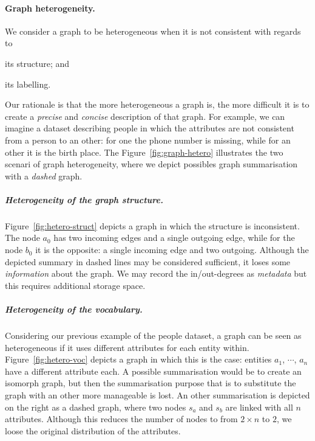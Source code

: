 \paragraph{Graph heterogeneity.}

We consider a graph to be heterogeneous when it is not consistent with regards to
\begin{inparaenum}[(a)]
\item its structure; and
\item its labelling.
\end{inparaenum}
Our rationale is that the more heterogeneous a graph is, the more difficult it is to create a \emph{precise} and \emph{concise} description of that graph. For example, we can imagine a dataset describing people in which the attributes are not consistent from a person to an other: for one the phone number is missing, while for an other it is the birth place. The Figure~\ref{fig:graph-hetero} illustrates the two scenari of graph heterogeneity, where we depict possibles graph summarisation with a \textit{dashed} graph.

\subparagraph{Heterogeneity of the graph structure.}

Figure~\ref{fig:hetero-struct} depicts a graph in which the structure is inconsistent. The node $a_0$ has two incoming edges and a single outgoing edge, while for the node $b_0$ it is the opposite: a single incoming edge and two outgoing. Although the depicted summary in dashed lines may be considered sufficient, it loses some \emph{information} about the graph. We may record the in/out-degrees as \emph{metadata} but this requires additional storage space.

\subparagraph{Heterogeneity of the vocabulary.}

Considering our previous example of the people dataset, a graph can be seen as heterogeneous if it uses different attributes for each entity within. Figure~\ref{fig:hetero-voc} depicts a graph in which this is the case: entities $a_1$, $\cdots$, $a_n$ have a different attribute each. A possible summarisation would be to create an isomorph graph, but then the summarisation purpose that is to substitute the graph with an other more manageable is lost. An other summarisation is depicted on the right as a dashed graph, where two nodes $s_a$ and $s_b$ are linked with all $n$ attributes. Although this reduces the number of nodes to from $2 \times n$ to $2$, we loose the original distribution of the attributes.\\

